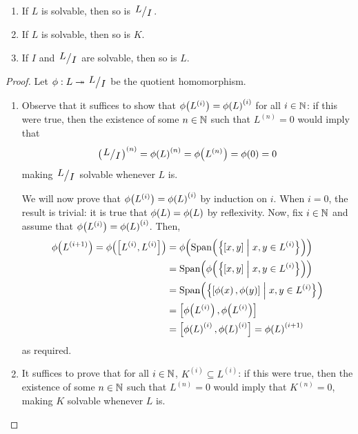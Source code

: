 \begin{boxproposition}
    \hfill
    \begin{enumerate}[label = \normalfont\arabic*., noitemsep]
        \item If $L$ is solvable, then so is $\quotient{L}{I}$.
        \item If $L$ is solvable, then so is $K$.
        \item If $I$ and $\quotient{L}{I}$ are solvable, then so is $L$.
    \end{enumerate}
\end{boxproposition}
\begin{proof}
    Let $\phi : L \surj \quotient{L}{I}$ be the quotient homomorphism.
    \begin{enumerate}
        \item Observe that it suffices to show that $\phi\!\left( L^{(i)} \right) = \phi\!\left( L \right)^{(i)}$ for all $i \in \mathbb{N}$: if this were true, then the existence of some $n \in \mathbb{N}$ such that $L^{(n)} = 0$ would imply that
        \begin{align*}
            \parenth{\quotient{L}{I}}^{(n)} = \phiof{L}^{(n)} = \phiof{L^{(n)}} = \phiof{0} = 0
        \end{align*}
        making $\quotient{L}{I}$ solvable whenever $L$ is.
        
        We will now prove that $\phi\!\left( L^{(i)} \right) = \phi\!\left( L \right)^{(i)}$ by induction on $i$. When $i = 0$, the result is trivial: it is true that $\phi\!\left( L \right) = \phi\!\left( L \right)$ by reflexivity. %
        Now, fix $i \in \mathbb{N}$ and assume that $\phi\!\left( L^{(i)} \right) = \phi\!\left( L \right)^{(i)}$. Then,
        \begin{align*}
            \phiof{L^{(i + 1)}} = \phiof{\brac{L^{(i)}, L^{(i)}}}
            &= \phiof{\Span{\setst{\brac{x,y}}{x, y \in L^{(i)}}}} \\
            &= \Span{\phiof{\setst{\brac{x,y}}{x, y \in L^{(i)}}}} \\
            &= \Span{\setst{\brac{\phiof{x}, \phiof{y}}}{x, y \in L^{(i)}}} \\
            &= \brac{\phiof{L^{(i)}}, \phiof{L^{(i)}}} \\
            &= \brac{\phiof{L}^{(i)}, \phiof{L}^{(i)}} = \phiof{L}^{(i + 1)}
        \end{align*}
        as required.

        \item It suffices to prove that for all $i \in \mathbb{N}$, $K^{(i)} \subseteq L^{(i)}$: if this were true, then the existence of some $n \in \mathbb{N}$ such that $L^{(n)} = 0$ would imply that $K^{(n)} = 0$, making $K$ solvable whenever $L$ is.
        

\end{enumerate}
\end{proof}
